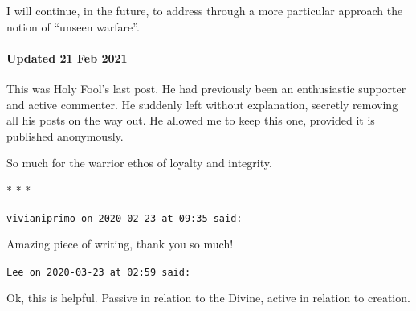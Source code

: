 I will continue, in the future, to address through a more particular approach the notion of ``unseen warfare''.

\paragraph{Updated 21 Feb 2021} This was Holy Fool's last post. He had previously been an enthusiastic supporter and active commenter. He suddenly left without explanation, secretly removing all his posts on the way out. He allowed me to keep this one, provided it is published anonymously.

So much for the warrior ethos of loyalty and integrity.


\begin{center}* * *\end{center}

\begin{footnotesize}
\begin{sffamily}
\texttt{vivianiprimo on 2020-02-23 at 09:35 said:}

Amazing piece of writing, thank you so much!

\hfill

\texttt{Lee on 2020-03-23 at 02:59 said:}

Ok, this is helpful. Passive in relation to the Divine, active in relation to creation.

\end{sffamily}
\end{footnotesize}

